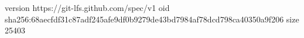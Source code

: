 version https://git-lfs.github.com/spec/v1
oid sha256:68aecfdf31c87adf245afe9df0b9279de43bd7984af78dcd798ca40350a9f206
size 25403
